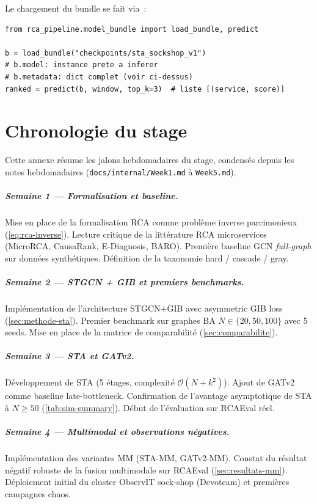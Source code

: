 \documentclass[a4paper,11pt,oneside]{report}
\begin{document}
Le chargement du bundle se fait via~:
\begin{lstlisting}[style=python]
from rca_pipeline.model_bundle import load_bundle, predict

b = load_bundle("checkpoints/sta_sockshop_v1")
# b.model: instance prete a inferer
# b.metadata: dict complet (voir ci-dessus)
ranked = predict(b, window, top_k=3)  # liste [(service, score)]
\end{lstlisting}

\chapter{Chronologie du stage}
\label{ann:chronologie}

Cette annexe r\'esume les jalons hebdomadaires du stage, condens\'es depuis les notes hebdomadaires (\texttt{docs/internal/Week1.md} \`a \texttt{Week5.md}).

\paragraph{Semaine 1 --- Formalisation et baseline.}
Mise en place de la formalisation RCA comme probl\`eme inverse parcimonieux (\cref{eq:rca-inverse}). Lecture critique de la litt\'erature RCA microservices (MicroRCA, CausaRank, E-Diagnosis, BARO). Premi\`ere baseline GCN \emph{full-graph} sur donn\'ees synth\'etiques. D\'efinition de la taxonomie hard / cascade / gray.

\paragraph{Semaine 2 --- STGCN + GIB et premiers benchmarks.}
Impl\'ementation de l'architecture STGCN+GIB avec asymmetric GIB loss (\cref{sec:methode-sta}). Premier benchmark sur graphes BA $N \in \{20, 50, 100\}$ avec 5 seeds. Mise en place de la matrice de comparabilit\'e (\cref{sec:comparabilite}).

\paragraph{Semaine 3 --- STA et GATv2.}
D\'eveloppement de STA (5 \'etages, complexit\'e $\mathcal{O}(N + k^2)$). Ajout de GATv2 comme baseline late-bottleneck. Confirmation de l'avantage asymptotique de STA \`a $N \ge 50$ (\cref{tab:sim-summary}). D\'ebut de l'\'evaluation sur RCAEval r\'eel.

\paragraph{Semaine 4 --- Multimodal et observations n\'egatives.}
Impl\'ementation des variantes MM (STA-MM, GATv2-MM). Constat du r\'esultat n\'egatif robuste de la fusion multimodale sur RCAEval (\cref{sec:resultats-mm}). D\'eploiement initial du cluster ObservIT sock-shop (Devoteam) et premi\`eres campagnes chaos.
\end{document}
